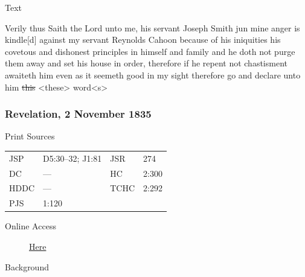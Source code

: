 			\begin{description}
				\item[Text]
			\end{description}
			
				Verily thus Saith the Lord unto me, his servant Joseph Smith jun mine anger is kindle[d] against my servant Reynolds Cahoon because of his iniquities his covetous and dishonest principles in himself and family and he doth not purge them away and set his house in order, therefore if he repent not chastisment awaiteth him even as it seemeth good in my sight therefore go and declare unto him \sout{this} <these> word<s>
				
		\subsubsection{Revelation, 2 November 1835}
			\label{EMS-1835-JS-2-NOV-1835}
			
			\begin{description}
				\item[Print Sources]
			\end{description}

				\begin{tabular}{p{0.5in}p{1in}p{0.5in}p{1in}}
				JSP	 	& D5:30--32; J1:81		& JSR 		& 274 \\
				DC	 	& --- 			& HC 		& 2:300 \\
				HDDC 	& ---			& TCHC 		& 2:292 \\
				PJS 	& 1:120			& 	 		&  \\
				\end{tabular}
			
			\begin{description}
				\item[Online Access] \href{https://www.josephsmithpapers.org/paper-summary/revelation-2-november-1835/1}{Here}
			\end{description}
			
			\begin{description}
				\item[Background]
			\end{description}
			
			
